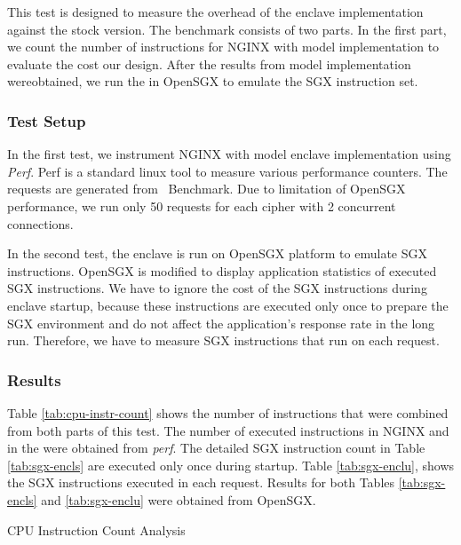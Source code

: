 \documentclass[../../../main.tex]{subfiles}
\begin{document}
\label{sec:cpu-instr-analysis}
This test is designed to measure the overhead of the enclave implementation
against the stock version. The benchmark consists of two parts.  In the first
part, we count the number of instructions for NGINX with model implementation
to evaluate the cost our design. After the results from model implementation
wereobtained, we run the \enclaveprogram in OpenSGX to emulate the SGX
instruction set.

\subsubsection*{Test Setup}
In the first test, we instrument NGINX with model enclave implementation using
\textit{Perf}. Perf is a standard linux tool to measure various performance
counters. The requests are generated from \Apache~Benchmark. Due to limitation
of OpenSGX performance, we run only 50 requests for each cipher with 2
concurrent connections.

In the second test, the enclave is run on OpenSGX platform to emulate SGX
instructions. OpenSGX is modified to display application statistics of executed
SGX instructions. We have to ignore the cost of the SGX instructions during
enclave startup, because these instructions are executed only once to prepare
the SGX environment and do not affect the application's response rate in the
long run. Therefore, we have to measure SGX instructions that run on each
request.

\subsubsection*{Results}
Table \ref{tab:cpu-instr-count} shows the number of instructions that were
combined from both parts of this test. The number of executed instructions
in NGINX and in the \enclaveprogram were obtained from \textit{perf}.
The detailed SGX instruction count in Table \ref{tab:sgx-encls} are executed
only once during startup. Table \ref{tab:sgx-enclu}, shows the SGX instructions
executed in each request. Results for both Tables \ref{tab:sgx-encls} and
\ref{tab:sgx-enclu} were obtained from OpenSGX.

\begin{table}[H]
  \caption{CPU Instruction Count Analysis}
  \label{tab:cpu-instr-count}
\end{table}
\end{document}
